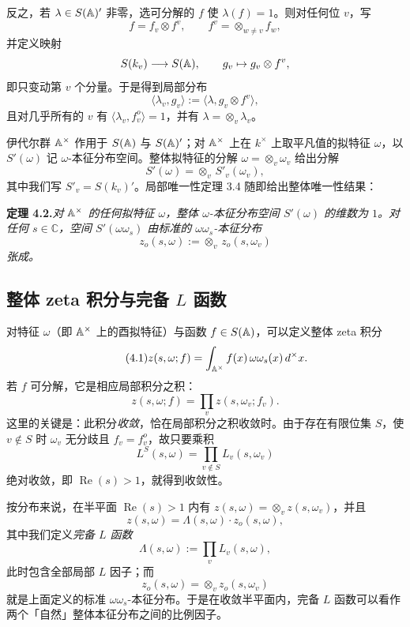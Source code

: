 反之，若 $\lambda\in S(\mathbb{A})'$ 非零，选可分解的 $f$ 使 $\lambda(f)=1$。则对任何位 $v$，写
\[
f=f_v\otimes f^v,\qquad f^v=\otimes_{w\ne v}f_w,
\]
并定义映射
\[
S(k_v)\longrightarrow S(\mathbb{A}),\qquad g_v\mapsto g_v\otimes f^v,
\]
即只变动第 $v$ 个分量。于是得到局部分布
\[
\langle\lambda_v,g_v\rangle:=\langle\lambda,g_v\otimes f^v\rangle,
\]
且对几乎所有的 $v$ 有 $\langle\lambda_v,f_v^o\rangle=1$，并有 $\lambda=\otimes_v\lambda_v$。

伊代尔群 $\mathbb{A}^\times$ 作用于 $S(\mathbb{A})$ 与 $S(\mathbb{A})'$；对 $\mathbb{A}^\times$ 上在 $k^\times$ 上取平凡值的拟特征 $\omega$，以 $S'(\omega)$ 记 $\omega$-本征分布空间。整体拟特征的分解 $\omega=\otimes_v\omega_v$ 给出分解
\[
S'(\omega)=\otimes_v\,S'_v(\omega_v),
\]
其中我们写 $S'_v=S(k_v)'$。局部唯一性定理 3.4 随即给出整体唯一性结果：

\medskip\noindent\textbf{定理 4.2.}\quad \emph{对 $\mathbb{A}^\times$ 的任何拟特征 $\omega$，整体 $\omega$-本征分布空间 $S'(\omega)$ 的维数为 $1$。对任何 $s\in\mathbb C$，空间 $S'(\omega\omega_s)$ 由标准的 $\omega\omega_s$-本征分布}
\[
z_o(s,\omega):=\otimes_v\,z_o(s,\omega_v)
\]
\emph{张成。}

\subsection*{整体 zeta 积分与完备 $L$ 函数}

对特征 $\omega$（即 $\mathbb{A}^\times$ 上的酉拟特征）与函数 $f\in S(\mathbb{A})$，可以定义整体 zeta 积分
\begin{equation*}\tag{4.1}
z(s,\omega;f)=\int_{\mathbb{A}^\times}f(x)\,\omega\omega_s(x)\,d^\times x.
\end{equation*}
若 $f$ 可分解，它是相应局部积分之积：
\begin{equation*}\tag{4.2}
z(s,\omega;f)=\prod_v z(s,\omega_v;f_v).
\end{equation*}
这里的关键是：此积分\emph{收敛}，恰在局部积分之积收敛时。由于存在有限位集 $S$，使 $v\notin S$ 时 $\omega_v$ 无分歧且 $f_v=f_v^o$，故只要乘积
\[
L^S(s,\omega)=\prod_{v\notin S}L_v(s,\omega_v)
\]
绝对收敛，即 $\operatorname{Re}(s)>1$，就得到收敛性。

按分布来说，在半平面 $\operatorname{Re}(s)>1$ 内有 $z(s,\omega)=\otimes_vz(s,\omega_v)$，并且
\begin{equation*}\tag{4.3}
z(s,\omega)=\Lambda(s,\omega)\cdot z_o(s,\omega),
\end{equation*}
其中我们定义\emph{完备 $L$ 函数}
\begin{equation*}\tag{4.4}
\Lambda(s,\omega):=\prod_v L_v(s,\omega),
\end{equation*}
此时包含全部局部 $L$ 因子；而
\begin{equation*}\tag{4.5}
z_o(s,\omega)=\otimes_v z_o(s,\omega_v)
\end{equation*}
就是上面定义的标准 $\omega\omega_s$-本征分布。于是在收敛半平面内，完备 $L$ 函数可以看作两个「自然」整体本征分布之间的比例因子。


